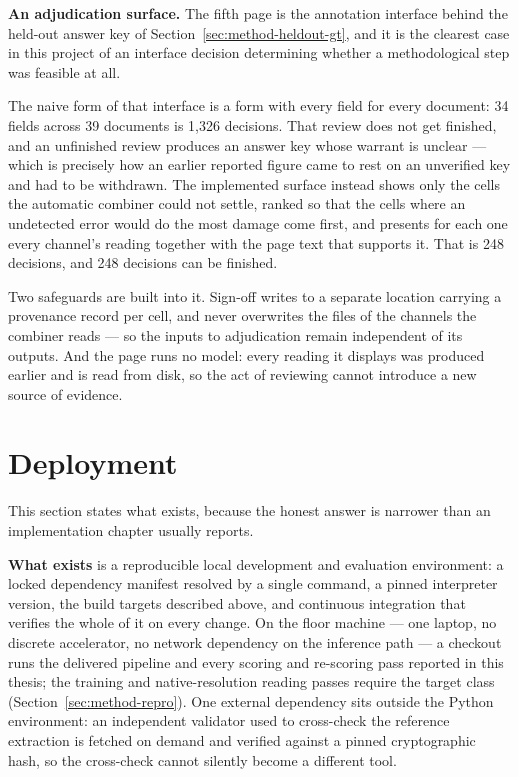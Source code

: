 \textbf{An adjudication surface.} The fifth page is the annotation interface behind the
held-out answer key of Section~\ref{sec:method-heldout-gt}, and it is the clearest case in this
project of an interface decision determining whether a methodological step was feasible at all.

The naive form of that interface is a form with every field for every document: 34 fields
across 39 documents is 1{,}326 decisions. That review does not get finished, and an unfinished
review produces an answer key whose warrant is unclear --- which is precisely how an earlier
reported figure came to rest on an unverified key and had to be withdrawn. The implemented
surface instead shows only the cells the automatic combiner could not settle, ranked so that
the cells where an undetected error would do the most damage come first, and presents for each
one every channel's reading together with the page text that supports it. That is 248
decisions, and 248 decisions can be finished.

Two safeguards are built into it. Sign-off writes to a separate location carrying a provenance
record per cell, and never overwrites the files of the channels the combiner reads --- so the
inputs to adjudication remain independent of its outputs. And the page runs no model: every
reading it displays was produced earlier and is read from disk, so the act of reviewing cannot
introduce a new source of evidence.

\section{Deployment}
\label{sec:sys-deploy}

This section states what exists, because the honest answer is narrower than an implementation
chapter usually reports.

\textbf{What exists} is a reproducible local development and evaluation environment: a locked
dependency manifest resolved by a single command, a pinned interpreter version, the build
targets described above, and continuous integration that verifies the whole of it on every
change. On the floor machine --- one laptop, no discrete accelerator, no network dependency on
the inference path --- a checkout runs the delivered pipeline and every scoring and re-scoring
pass reported in this thesis; the training and native-resolution reading passes require the
target class (Section~\ref{sec:method-repro}). One external
dependency sits outside the Python environment: an independent validator used to cross-check
the reference extraction is fetched on demand and verified against a pinned cryptographic
hash, so the cross-check cannot silently become a different tool.

